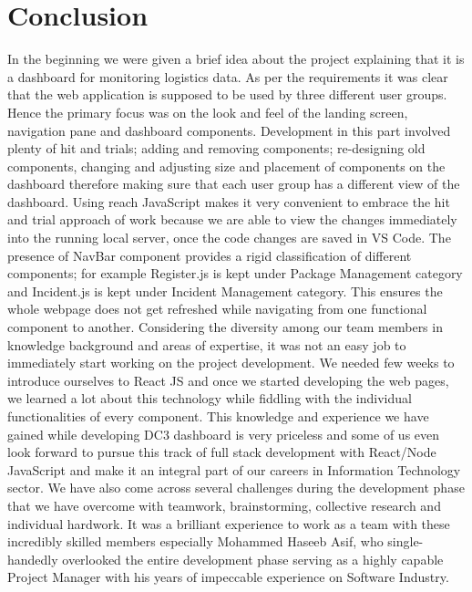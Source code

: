 \chapter{Conclusion}
\label{cha:conclusion}

In the beginning we were given a brief idea about the project explaining that it is a dashboard for monitoring logistics data. As per the requirements it was clear that the web application is supposed to be used by three different user groups. Hence the primary focus was on the look and feel of the landing screen, navigation pane and dashboard components. Development in this part involved plenty of hit and trials; adding and removing components; re-designing old components, changing and adjusting size and placement of components on the dashboard therefore making sure that each user group has a different view of the dashboard. Using reach JavaScript makes it very convenient to embrace the hit and trial approach of work because we are able to view the changes immediately into the running local server, once the code changes are saved in VS Code. The presence of NavBar component provides a rigid classification of different components; for example Register.js is kept under Package Management category and Incident.js is kept under Incident Management category. This ensures the whole webpage does not get refreshed while navigating from one functional component to another. Considering the diversity among our team members in knowledge background and areas of expertise, it was not an easy job to immediately start working on the project development. We needed few weeks to introduce ourselves to React JS and once we started developing the web pages, we learned a lot about this technology while fiddling with the individual functionalities of every component. This knowledge and experience we have gained while developing DC3 dashboard is very priceless and some of us even look forward to pursue this track of full stack development with React/Node JavaScript and make it an integral part of our careers in Information Technology sector. We have also come across several challenges during the development phase that we have overcome with teamwork, brainstorming, collective research and individual hardwork. It was a brilliant experience to work as a team with these incredibly skilled members especially Mohammed Haseeb Asif, who single-handedly overlooked the entire development phase serving as a highly capable Project Manager with his years of impeccable experience on Software Industry.
